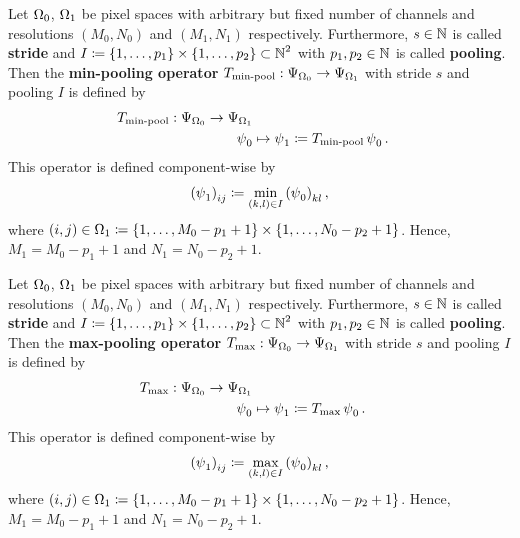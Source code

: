 \begin{proposition}\label{min_pooling}
Let $\Omega_0$, $\Omega_1$ be pixel spaces with arbitrary but fixed number of channels and resolutions $(M_0,N_0)$ and $(M_1,N_1)$ respectively. Furthermore, $s\in\operatorname{\mathbb{N}}$ is called \textbf{stride} and $I\coloneqq \{1,\ldots,p_1\}\times \{1,\ldots,p_2\} \subset\operatorname{\mathbb{N}}^2$ with $p_1,p_2\in\operatorname{\mathbb{N}}$ is called \textbf{pooling}.\\
Then the \textbf{min-pooling operator} $T_{\text{min-pool}}: \Psi_{\Omega_0} \to \Psi_{\Omega_1}$ with stride $s$ and pooling $I$ is defined by
\begin{align*}
T_{\text{min-pool}}: \Psi_{\Omega_0} \to \Psi_{\Omega_1} \\
\operatorname{\psi}_0 &\mapsto \operatorname{\psi}_1 \coloneqq T_{\text{min-pool}}\operatorname{\psi}_0 .
\end{align*}
This operator is defined component-wise by
\begin{align}
\left(\operatorname{\psi}_1\right)_{ij} \coloneqq  \min_{(k,l)\in I} \left(\operatorname{\psi}_0\right)_{kl},
\end{align}
where $(i,j) \in \Omega_1 \coloneqq \{1,\ldots, M_0-p_1+1\} \times \{1,\ldots, N_0-p_2+1\}$. Hence, $M_1 = M_0-p_1+1$ and $N_1 = N_0-p_2+1$.
\end{proposition}

\begin{proposition}\label{max_pooling}
Let $\Omega_0$, $\Omega_1$ be pixel spaces with arbitrary but fixed number of channels and resolutions $(M_0,N_0)$ and $(M_1,N_1)$ respectively. Furthermore, $s\in\operatorname{\mathbb{N}}$ is called \textbf{stride} and $I\coloneqq \{1,\ldots,p_1\}\times \{1,\ldots,p_2\} \subset\operatorname{\mathbb{N}}^2$ with $p_1,p_2\in\operatorname{\mathbb{N}}$ is called \textbf{pooling}.\\
Then the \textbf{max-pooling operator} $T_{\text{max}}: \Psi_{\Omega_0} \to \Psi_{\Omega_1}$ with stride $s$ and pooling $I$ is defined by
\begin{align*}
T_{\text{max}}: \Psi_{\Omega_0} \to \Psi_{\Omega_1} \\
\operatorname{\psi}_0 &\mapsto \operatorname{\psi}_1 \coloneqq T_{\text{max}}\operatorname{\psi}_0 .
\end{align*}
This operator is defined component-wise by
\begin{align}
\left(\operatorname{\psi}_1\right)_{ij} \coloneqq  \max_{(k,l)\in I} \left(\operatorname{\psi}_0\right)_{kl},
\end{align}
where $(i,j) \in \Omega_1 \coloneqq \{1,\ldots, M_0-p_1+1\} \times \{1,\ldots, N_0-p_2+1\}$. Hence, $M_1 = M_0-p_1+1$ and $N_1 = N_0-p_2+1$.
\end{proposition}
